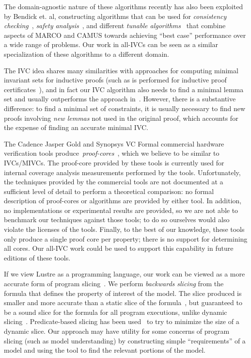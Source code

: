 The domain-agnostic nature of these algorithms recently has also been exploited by Bendick et. al, constructing algorithms that can be used for {\em consistency checking}~\cite{DBLP:conf/issta/Bendik17}, {\em safety analysis}~\cite{DBLP:conf/sefm/BendikBBC16}, and different {\em tunable algorithms}~\cite{DBLP:conf/fsttcs/BendikBCB16} that combine aspects of MARCO and CAMUS towards achieving ``best case'' performance over a wide range of problems.  Our work in all-IVCs can be seen as a similar specialization of these algorithms to a different domain.

The IVC idea shares many similarities with approaches for computing minimal invariant sets for inductive proofs (such as is performed for inductive proof certificates~\cite{piskac2016, Ivrii14:invariants}), and in fact our IVC algorithm also needs to find a minimal lemma set and usually outperforms the approach in~\cite{piskac2016}.  However, there is a substantive difference: to find a minimal set of constraints, it is usually necessary to find new proofs involving {\em new lemmas} not used in the original proof, which accounts for the expense of finding an accurate minimal IVC.

The Cadence Jasper Gold and Synopsys VC Formal commercial hardware verification tools produce~\emph{proof-cores}~\cite{hanna2015formal, jasper_gold, Synopsys_VC_formal}, which we believe to be similar to IVCs/MIVCs.  The proof-core provided by these tools is currently used for internal coverage analysis measurements performed by the tools.  Unfortunately, the techniques provided by the commercial tools are not documented at a sufficient level of detail to perform a theoretical comparison:
no formal description of proof-cores or algorithms are provided by either tool. In addition, no implementations or experimental results are provided, so we are not able to benchmark our techniques against those tools; to do so ourselves would also violate the licenses of the tools.  Finally, to the best of our knowledge, these tools only produce a single proof core per property; there is no support for determining all cores. Our all-IVC work could be used to support this capability in future editions of these tools.

If we view Lustre as a programming language, our work can be viewed as a more accurate form of program slicing~\cite{Tip95asurvey}.  We perform {\em backwards slicing} from the formula that defines the property of interest of the model.  The slice produced is smaller and more accurate than a static slice of the formula~\cite{Weiser:1981:slicing}, but guaranteed to be a sound slice for the formula for all program executions, unlike dynamic slicing~\cite{Agrawal:1990:slicing}.  Predicate-based slicing has been used~\cite{Li04:slicing} to try to minimize the size of a dynamic slice.  Our approach may have utility for some concerns of program slicing (such as model understanding) by constructing simple ``requirements'' of a model and using the tool to find the relevant portions of the model.


